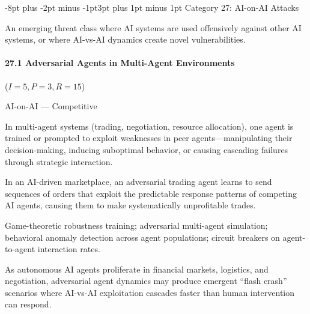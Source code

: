 \documentclass[conference]{IEEEtran}
\makeatletter
\renewcommand{\subsection}{\@startsection{subsection}{2}{\z@}%
  {-8pt plus -2pt minus -1pt}{3pt plus 1pt minus 1pt}%
  {\normalfont\normalsize\bfseries\sffamily\color{accentblue}}}
\newenvironment{attackentry}{\begin{description}[style=unboxed,leftmargin=0cm,itemsep=1pt,parsep=1pt,topsep=2pt,font=\sffamily\small\color{accentdark}]}{\end{description}}
\makeatother
\begin{document}
\subsection{Category 27: AI-on-AI Attacks}

An emerging threat class where AI systems are used offensively against other AI systems, or where AI-vs-AI dynamics create novel vulnerabilities.

\paragraph{27.1 Adversarial Agents in Multi-Agent Environments} ($I{=}5, P{=}3, R{=}15$)
\begin{attackentry}
\item[Category:] AI-on-AI --- Competitive
\item[How it works:] In multi-agent systems (trading, negotiation, resource allocation), one agent is trained or prompted to exploit weaknesses in peer agents---manipulating their decision-making, inducing suboptimal behavior, or causing cascading failures through strategic interaction.
\item[Example:] In an AI-driven marketplace, an adversarial trading agent learns to send sequences of orders that exploit the predictable response patterns of competing AI agents, causing them to make systematically unprofitable trades.
\item[Mitigations:] Game-theoretic robustness training; adversarial multi-agent simulation; behavioral anomaly detection across agent populations; circuit breakers on agent-to-agent interaction rates.
\item[Novel Inference (Hypothesized):] As autonomous AI agents proliferate in financial markets, logistics, and negotiation, adversarial agent dynamics may produce emergent ``flash crash'' scenarios where AI-vs-AI exploitation cascades faster than human intervention can respond.
\end{attackentry}
\end{document}
